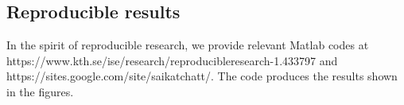 \documentclass[journal]{IEEEtran}
\begin{document}
\subsection{Reproducible results}
In the spirit of reproducible research, we provide relevant Matlab codes at https://www.kth.se/ise/research/reproducibleresearch-1.433797 and https://sites.google.com/site/saikatchatt/. The code produces the results shown in the figures.



%
%



%
%
\end{document}
